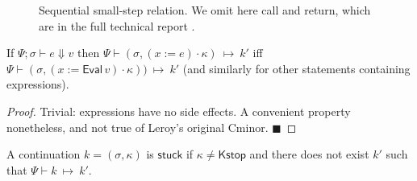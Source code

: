 \documentclass{llncs}
\newcommand{\cminor}{Cminor}
\newcommand{\infrencee}[2]{
\inference{\hspace*{-8pt}#1\hspace*{-8pt}}{\hspace*{-8pt} #2\hspace*{-8pt}}}
\newcommand{\tyface}[1]{\ensuremath{\mathsf{#1}}}
\newcommand{\Eval}{\tyface{Eval}}
\newcommand{\Sassign}[2]{#1:=#2}
\newcommand{\Sstore}[3]{\tyface{[}#2\tyface{]}_{#1}\tyface{:=}#3}
\newcommand{\Sif}[3]{\tyface{if}\,#1\,\tyface{then}\,#2\,\tyface{else}\,#3}
\newcommand{\Sloop}[1]{\tyface{loop}\,#1}
\newcommand{\Sblock}[1]{\tyface{block}\,#1}
\newcommand{\Sexit}[1]{\tyface{exit}\,#1}
\newcommand{\Sseq}[2]{#1;#2}
\newcommand{\Sskip}{\tyface{skip}}
\newcommand{\Kstop}{\tyface{Kstop}}
\newcommand{\Kseq}[2]{#1\cdot #2}
\newcommand{\Kblock}[1]{\tyface{Kblock\,#1}}
\newcommand{\Cont}[2]{(#1,#2)}
\newcommand{\ctl}{\kappa} \newcommand{\stmt}{\tyface{stmt}}
\newcommand{\fmap}{\Psi}
\newcommand{\infootprint}[4]{#4 \vdash \tyface{#3}_#2\, #1}
\newcommand{\evalexp}[3]{\fmap; #1 \vdash #2 \Downarrow #3}
\newcommand{\storev}[5]{#5=#2[#3\stackrel{#1}{:=}#4]}
\newcommand{\step}[2]{\fmap \vdash #1\:\longmapsto\:#2}
\begin{document}
\begin{figure}[t]
\caption{Sequential small-step relation.  We omit here call and return, which are in the full technical report \cite{appel07:tr}.}
\label{fig-step}
\end{figure}

\begin{lemma}
If $\evalexp{\sigma}{e}{v}$
then 
$\step{\Cont\sigma{\Kseq{(\Sassign{x}{e})}\ctl}}{k'}$
iff
$\step{\Cont\sigma{\Kseq{(\Sassign{x}{\Eval\,v})}\ctl)}}{k'}$
(and similarly for other statements containing expressions).
\vspace{-7pt}
\begin{proof}
Trivial: expressions have no side effects.
A convenient property nonetheless, and not true of 
Leroy's original \cminor{}.
$\blacksquare$
\end{proof}
\end{lemma}

\begin{definition}
A continuation $k=(\sigma,\ctl)$ 
is \tyface{stuck} if
$\ctl \not=\Kstop$ and
there does not exist $k'$ such that 
$ \step{k}{k'}$.
\end{definition}
\end{document}
